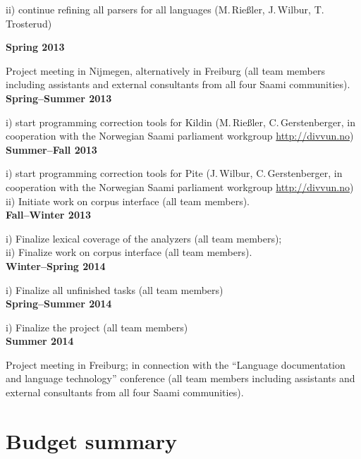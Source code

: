\documentclass[a4paper,12pt]{article}
\begin{document}
{{ii) continue refining all parsers for all languages (M.\,Rießler, J.\,Wilbur, T.\,Trosterud)

\noindent \textbf{Spring 2013} 

Project meeting in Nijmegen, alternatively in Freiburg (all team members including assistants and external consultants from all four Saami communities).\\

\noindent \textbf{Spring–Summer 2013} 

i) start programming correction tools for Kildin (M.\,Rießler, C.\,Gerstenberger, in cooperation with the Norwegian Saami parliament workgroup \url{http://divvun.no})\\

\noindent \textbf{Summer–Fall 2013}

i) start programming correction tools for Pite (J.\,Wilbur, C.\,Gerstenberger, in cooperation with the Norwegian Saami parliament workgroup \url{http://divvun.no})\\ %
ii) Initiate work on corpus interface (all team members).\\

\noindent \textbf{Fall–Winter 2013}

i) Finalize lexical coverage of the analyzers (all team members);\\

ii) Finalize work on corpus interface (all team members).\\

\noindent \textbf{Winter–Spring 2014}

i) Finalize all unfinished tasks (all team members)\\

\noindent \textbf{Spring–Summer 2014}

i) Finalize the project (all team members)\\

\noindent \textbf{Summer 2014} 

Project meeting in Freiburg; in connection with the “Language documentation and language technology” conference (all team members including assistants and external consultants from all four Saami communities).

\section{Budget summary}

}}
\end{document}
